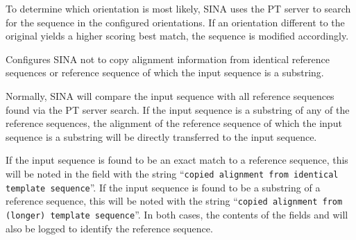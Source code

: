 \documentclass[english,a4paper]{article}
\begin{document}
\begin{Description}
To determine which orientation is most likely, SINA uses the PT server to search for the sequence in the
configured orientations. If an orientation different to the original yields a higher scoring best match, 
the sequence is modified accordingly.
\item[\Opt{-{}-realign}]
Configures SINA not to copy alignment information from identical reference sequences or reference
sequence of which the input sequence is a substring. 

Normally, SINA will compare the input sequence with all reference sequences found via the PT server search. 
If the input sequence is a substring of any of the reference sequences, the alignment of the reference
sequence of which the input sequence is a substring will be directly transferred to the input sequence.

If the input sequence is found to be an exact match to a reference sequence, this will be noted in the field
 with the string ``\texttt{copied alignment from identical template sequence}''. If the input
sequence is found to be a substring of a reference sequence, this will be noted with the string
``\texttt{copied alignment from (longer) template sequence}''. In both cases, the contents of the fields 
and  will also be logged to identify the reference sequence. 


\end{Description}
\end{document}
